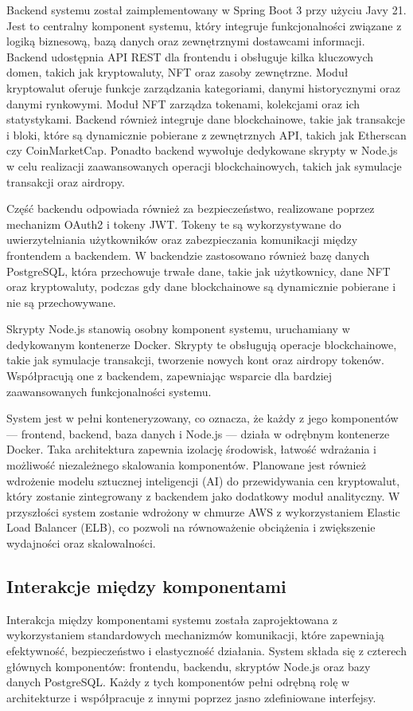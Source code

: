 Backend systemu został zaimplementowany w Spring Boot 3 przy użyciu Javy 21. Jest to centralny komponent systemu, który integruje funkcjonalności związane z logiką biznesową, bazą danych oraz zewnętrznymi dostawcami informacji. Backend udostępnia API REST dla frontendu i obsługuje kilka kluczowych domen, takich jak kryptowaluty, NFT oraz zasoby zewnętrzne. Moduł kryptowalut oferuje funkcje zarządzania kategoriami, danymi historycznymi oraz danymi rynkowymi. Moduł NFT zarządza tokenami, kolekcjami oraz ich statystykami. Backend również integruje dane blockchainowe, takie jak transakcje i bloki, które są dynamicznie pobierane z zewnętrznych API, takich jak Etherscan czy CoinMarketCap. Ponadto backend wywołuje dedykowane skrypty w Node.js w celu realizacji zaawansowanych operacji blockchainowych, takich jak symulacje transakcji oraz airdropy.

Część backendu odpowiada również za bezpieczeństwo, realizowane poprzez mechanizm OAuth2 i tokeny JWT. Tokeny te są wykorzystywane do uwierzytelniania użytkowników oraz zabezpieczania komunikacji między frontendem a backendem. W backendzie zastosowano również bazę danych PostgreSQL, która przechowuje trwałe dane, takie jak użytkownicy, dane NFT oraz kryptowaluty, podczas gdy dane blockchainowe są dynamicznie pobierane i nie są przechowywane.

Skrypty Node.js stanowią osobny komponent systemu, uruchamiany w dedykowanym kontenerze Docker. Skrypty te obsługują operacje blockchainowe, takie jak symulacje transakcji, tworzenie nowych kont oraz airdropy tokenów. Współpracują one z backendem, zapewniając wsparcie dla bardziej zaawansowanych funkcjonalności systemu.

System jest w pełni konteneryzowany, co oznacza, że każdy z jego komponentów — frontend, backend, baza danych i Node.js — działa w odrębnym kontenerze Docker. Taka architektura zapewnia izolację środowisk, łatwość wdrażania i możliwość niezależnego skalowania komponentów. Planowane jest również wdrożenie modelu sztucznej inteligencji (AI) do przewidywania cen kryptowalut, który zostanie zintegrowany z backendem jako dodatkowy moduł analityczny. W przyszłości system zostanie wdrożony w chmurze AWS z wykorzystaniem Elastic Load Balancer (ELB), co pozwoli na równoważenie obciążenia i zwiększenie wydajności oraz skalowalności.

\subsection{Interakcje między komponentami}
Interakcja między komponentami systemu została zaprojektowana z wykorzystaniem standardowych mechanizmów komunikacji, które zapewniają efektywność, bezpieczeństwo i elastyczność działania. System składa się z czterech głównych komponentów: frontendu, backendu, skryptów Node.js oraz bazy danych PostgreSQL. Każdy z tych komponentów pełni odrębną rolę w architekturze i współpracuje z innymi poprzez jasno zdefiniowane interfejsy.

